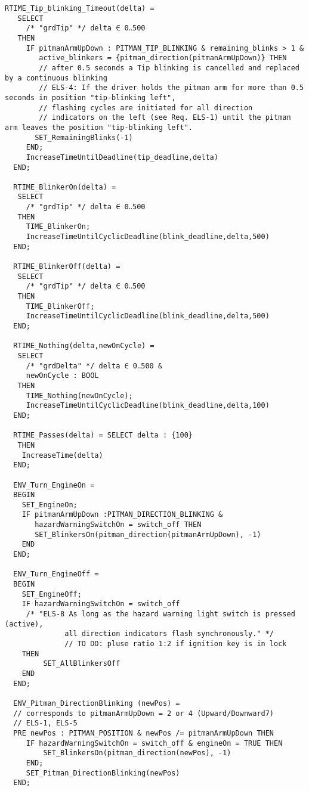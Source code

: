 \documentclass[11pt]{article}
\begin{document}
\begin{lstlisting}[caption = PitmanController\_TIME\_MC\_v4 MCH Code]
  RTIME_Tip_blinking_Timeout(delta) =
   SELECT
     /* "grdTip" */ delta ∈ 0‥500
   THEN
     IF pitmanArmUpDown : PITMAN_TIP_BLINKING & remaining_blinks > 1 &
        active_blinkers = {pitman_direction(pitmanArmUpDown)} THEN
        // after 0.5 seconds a Tip blinking is cancelled and replaced by a continuous blinking
        // ELS-4: If the driver holds the pitman arm for more than 0.5 seconds in position "tip-blinking left",
        // flashing cycles are initiated for all direction
        // indicators on the left (see Req. ELS-1) until the pitman arm leaves the position "tip-blinking left".
       SET_RemainingBlinks(-1)
     END;
     IncreaseTimeUntilDeadline(tip_deadline,delta)
  END;
  
  RTIME_BlinkerOn(delta) =
   SELECT
     /* "grdTip" */ delta ∈ 0‥500
   THEN
     TIME_BlinkerOn;
     IncreaseTimeUntilCyclicDeadline(blink_deadline,delta,500)
  END;
  
  RTIME_BlinkerOff(delta) =
   SELECT
     /* "grdTip" */ delta ∈ 0‥500
   THEN
     TIME_BlinkerOff;
     IncreaseTimeUntilCyclicDeadline(blink_deadline,delta,500)
  END;
  
  RTIME_Nothing(delta,newOnCycle) =
   SELECT
     /* "grdDelta" */ delta ∈ 0‥500 &
     newOnCycle : BOOL
   THEN
     TIME_Nothing(newOnCycle);
     IncreaseTimeUntilCyclicDeadline(blink_deadline,delta,100)
  END;
  
  RTIME_Passes(delta) = SELECT delta : {100}
   THEN
    IncreaseTime(delta)
  END;
  
  ENV_Turn_EngineOn =
  BEGIN
    SET_EngineOn;
    IF pitmanArmUpDown :PITMAN_DIRECTION_BLINKING &
       hazardWarningSwitchOn = switch_off THEN
       SET_BlinkersOn(pitman_direction(pitmanArmUpDown), -1)
    END
  END;
  
  ENV_Turn_EngineOff =
  BEGIN
    SET_EngineOff;
    IF hazardWarningSwitchOn = switch_off
     /* "ELS-8 As long as the hazard warning light switch is pressed (active),
              all direction indicators flash synchronously." */
              // TO DO: pluse ratio 1:2 if ignition key is in lock
    THEN
         SET_AllBlinkersOff
    END
  END;
  
  ENV_Pitman_DirectionBlinking (newPos) =
  // corresponds to pitmanArmUpDown = 2 or 4 (Upward/Downward7)
  // ELS-1, ELS-5
  PRE newPos : PITMAN_POSITION & newPos /= pitmanArmUpDown THEN
     IF hazardWarningSwitchOn = switch_off & engineOn = TRUE THEN
         SET_BlinkersOn(pitman_direction(newPos), -1)
     END;
     SET_Pitman_DirectionBlinking(newPos)
  END;
  

\end{lstlisting}
\end{document}
